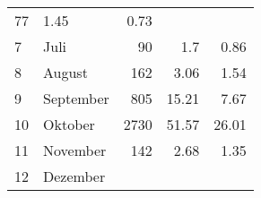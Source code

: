 \begin{longtable}{lXrrr}
       \num{77} &
       \num[round-mode=places,round-precision=2]{1,45} &
         \num[round-mode=places,round-precision=2]{0,73} \\

     7 &
     \multicolumn{1}{X}{ Juli   } &


       \num{90} &
       \num[round-mode=places,round-precision=2]{1,7} &
         \num[round-mode=places,round-precision=2]{0,86} \\

     8 &
     \multicolumn{1}{X}{ August   } &


       \num{162} &
       \num[round-mode=places,round-precision=2]{3,06} &
         \num[round-mode=places,round-precision=2]{1,54} \\

     9 &
     \multicolumn{1}{X}{ September   } &


       \num{805} &
       \num[round-mode=places,round-precision=2]{15,21} &
         \num[round-mode=places,round-precision=2]{7,67} \\

     10 &
     \multicolumn{1}{X}{ Oktober   } &


       \num{2730} &
       \num[round-mode=places,round-precision=2]{51,57} &
         \num[round-mode=places,round-precision=2]{26,01} \\

     11 &
     \multicolumn{1}{X}{ November   } &


       \num{142} &
       \num[round-mode=places,round-precision=2]{2,68} &
         \num[round-mode=places,round-precision=2]{1,35} \\

     12 &
     \multicolumn{1}{X}{ Dezember   } &



\end{longtable}
